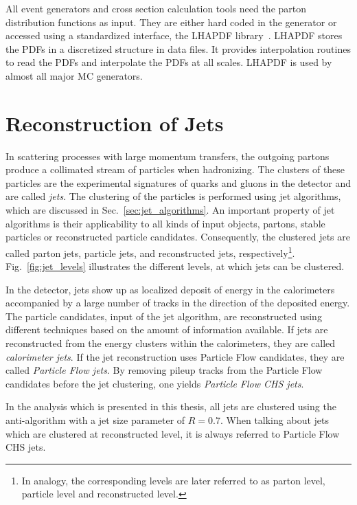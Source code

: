 All event generators and cross section calculation tools need the parton
distribution functions as input. They are either hard coded in the generator or
accessed using a standardized interface, the LHAPDF
library~\cite{Whalley:2005nh,Buckley:2014ana}. LHAPDF stores the PDFs in a discretized
structure in data files. It provides interpolation routines to read the PDFs and
interpolate the PDFs at all scales. LHAPDF is used by almost all major MC
generators.


\section{Reconstruction of Jets}
\label{sec:jet_reconstruction}

In scattering processes with large momentum transfers, the outgoing partons
produce a collimated stream of particles when hadronizing. The clusters of these
particles are the experimental signatures of quarks and gluons in the detector
and are called \emph{jets}. The clustering of the particles is performed using
jet algorithms, which are discussed in Sec.~\ref{sec:jet_algorithms}. An
important property of jet algorithms is their applicability to all kinds of
input objects, \ie partons, stable particles or reconstructed particle
candidates. Consequently, the clustered jets are called parton jets, particle
jets, and reconstructed jets, respectively\footnote{In analogy, the 
corresponding levels are later referred to as parton level, particle level
and reconstructed level.}. Fig.~\ref{fig:jet_levels} illustrates the different
levels, at which jets can be clustered.

In the \CMS detector, jets show up as localized deposit of energy in the
calorimeters accompanied by a large number of tracks in the direction of the
deposited energy. The particle candidates, input of the jet algorithm,  are
reconstructed using different techniques based on the amount of information
available. If jets are reconstructed from the energy clusters within the
calorimeters, they are called \emph{calorimeter jets}. If the jet reconstruction
uses Particle Flow candidates, they are called \emph{Particle Flow jets}. By
removing pileup tracks from the Particle Flow candidates before the jet
clustering, one yields \emph{Particle Flow CHS jets}. 

In the analysis which is presented in this thesis, all jets are clustered using
the anti-\kt algorithm with a jet size parameter of $R=0.7$. When talking about
jets which are clustered at reconstructed level, it is always referred to
Particle Flow CHS jets.

